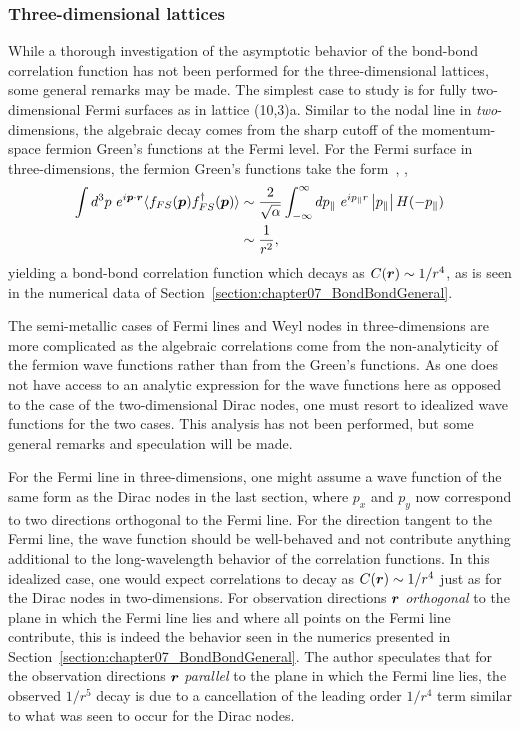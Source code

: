 %
%
\subsubsection{Three-dimensional lattices}
\label{section:chapter07_BondBondThreeDimensions}
%
%
While a thorough investigation of the asymptotic behavior of the bond-bond correlation function has not been performed for the three-dimensional lattices, some general remarks may be made.
The simplest case to study is for fully two-dimensional Fermi surfaces as in lattice (10,3)a.
Similar to the nodal line in \textit{two}-dimensions, the algebraic decay comes from the sharp cutoff of the momentum-space fermion Green's functions at the Fermi level.
For the Fermi surface in three-dimensions, the fermion Green's functions take the form~\cite{Lighthill1958}, \eg,
%
\begin{align}
	\int d^3p~ e^{i\bm{p}\cdot\bm{r}} \langle f_{FS}(\bm{p}) f^{\dagger}_{FS}(\bm{p}) \rangle &\sim \frac{2}{\sqrt{\alpha}} \int_{-\infty}^{\infty} dp_{\parallel}~ e^{i p_{\parallel} r} \left| p_{\parallel} \right| H(-p_{\parallel}) \nonumber\\
	&\sim \frac{1}{r^2},
\end{align}
%
yielding a bond-bond correlation function which decays as $C(\bm{r}) \sim 1/r^4$, as is seen in the numerical data of Section~\ref{section:chapter07_BondBondGeneral}.

The semi-metallic cases of Fermi lines and Weyl nodes in three-dimensions are more complicated as the algebraic correlations come from the non-analyticity of the fermion wave functions rather than from the Green's functions.
As one does not have access to an analytic expression for the wave functions here as opposed to the case of the two-dimensional Dirac nodes, one must resort to idealized wave functions for the two cases.
This analysis has not been performed, but some general remarks and speculation will be made.

For the Fermi line in three-dimensions, one might assume a wave function of the same form as the Dirac nodes in the last section, where $p_x$ and $p_y$ now correspond to two directions orthogonal to the Fermi line.
For the direction tangent to the Fermi line, the wave function should be well-behaved and not contribute anything additional to the long-wavelength behavior of the correlation functions.
In this idealized case, one would expect correlations to decay as $C(\bm{r}) \sim 1/r^4$ just as for the Dirac nodes in two-dimensions.
For observation directions $\bm{r}$ \textit{orthogonal} to the plane in which the Fermi line lies and where all points on the Fermi line contribute, this is indeed the behavior seen in the numerics presented in Section~\ref{section:chapter07_BondBondGeneral}.
The author speculates that for the observation directions $\bm{r}$ \textit{parallel} to the plane in which the Fermi line lies, the observed $1/r^5$ decay is due to a cancellation of the leading order $1/r^4$ term similar to what was seen to occur for the Dirac nodes.

